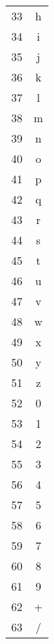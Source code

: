{\begin{tabular}{c c}
  33 & h \\
  34 & i \\
  35 & j \\
  36 & k \\
  37 & l \\
  38 & m \\
  39 & n \\
  40 & o \\
  41 & p \\
  42 & q \\
  43 & r \\
  44 & s \\
  45 & t \\
  46 & u \\
  47 & v \\
  48 & w \\
  49 & x \\
  50 & y \\
  51 & z \\
  52 & 0 \\
  53 & 1 \\
  54 & 2 \\
  55 & 3 \\
  56 & 4 \\
  57 & 5 \\
  58 & 6 \\
  59 & 7 \\
  60 & 8 \\
  61 & 9 \\
  62 & + \\
  63 & / \\
\end{tabular}}
